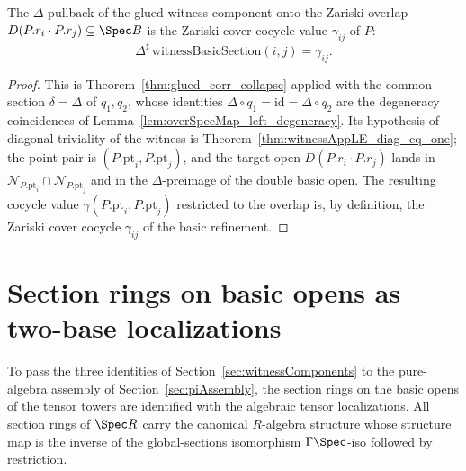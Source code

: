 \begin{theorem}
  \label{thm:witnessBasicSection_collapse}
  \leanok
  The \(\Delta\)-pullback of the glued witness component onto the Zariski overlap
  \(D(P.r_i \cdot P.r_j) \subseteq \Spec B\) is the Zariski cover cocycle value \(\gamma_{ij}\)
  of \(P\):
  \[
    \Delta^{\sharp}\,\mathrm{witnessBasicSection}(i, j) = \gamma_{ij} .
  \]
\end{theorem}
\begin{proof}
  \leanok
  This is Theorem~\ref{thm:glued_corr_collapse} applied with the common section \(\delta =
  \Delta\) of \(q_1, q_2\), whose identities \(\Delta \circ q_1 = \mathrm{id} = \Delta \circ
  q_2\) are the degeneracy coincidences of Lemma~\ref{lem:overSpecMap_left_degeneracy}. Its
  hypothesis of diagonal triviality of the witness is
  Theorem~\ref{thm:witnessAppLE_diag_eq_one}; the point pair is \((P.\mathrm{pt}_i,
  P.\mathrm{pt}_j)\), and the target open \(D(P.r_i \cdot P.r_j)\) lands in \(\mathcal
  N_{P.\mathrm{pt}_i} \cap \mathcal N_{P.\mathrm{pt}_j}\) and in the \(\Delta\)-preimage of the
  double basic open. The resulting cocycle value \(\gamma(P.\mathrm{pt}_i, P.\mathrm{pt}_j)\)
  restricted to the overlap is, by definition, the Zariski cover cocycle \(\gamma_{ij}\) of the
  basic refinement.
\end{proof}

\section{Section rings on basic opens as two-base localizations}
\label{sec:witnessAway}

To pass the three identities of Section~\ref{sec:witnessComponents} to the pure-algebra
assembly of Section~\ref{sec:piAssembly}, the section rings on the basic opens of the tensor
towers are identified with the algebraic tensor localizations. All section rings of
\(\Spec R\) carry the canonical \(R\)-algebra structure whose structure map is the inverse of
the global-sections isomorphism \(\Gamma\Spec\)-iso followed by restriction.

